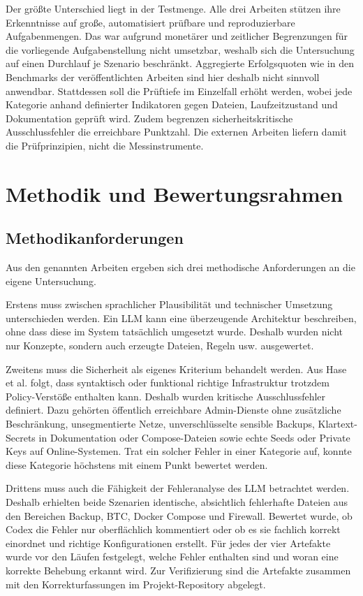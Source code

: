 Der größte Unterschied liegt in der Testmenge. Alle drei Arbeiten stützen ihre Erkenntnisse auf große, automatisiert prüfbare und reproduzierbare Aufgabenmengen. 
Das war aufgrund monetärer und zeitlicher Begrenzungen für die vorliegende Aufgabenstellung nicht umsetzbar, weshalb sich die Untersuchung auf einen Durchlauf je Szenario beschränkt.
Aggregierte Erfolgsquoten wie in den Benchmarks der veröffentlichten Arbeiten sind hier deshalb nicht sinnvoll anwendbar. 
Stattdessen soll die Prüftiefe im Einzelfall erhöht werden, wobei jede Kategorie anhand definierter Indikatoren gegen Dateien, Laufzeitzustand und Dokumentation geprüft wird. Zudem begrenzen sicherheitskritische Ausschlussfehler die erreichbare Punktzahl.
Die externen Arbeiten liefern damit die Prüfprinzipien, nicht die Messinstrumente.


\section{Methodik und Bewertungsrahmen}

\subsection{Methodikanforderungen} \label{subsec:methodikanforderungen}

Aus den genannten Arbeiten ergeben sich drei methodische Anforderungen an die eigene Untersuchung.

Erstens muss zwischen sprachlicher Plausibilität und technischer Umsetzung unterschieden werden. Ein \ac{LLM} kann eine überzeugende Architektur beschreiben, ohne dass diese im System tatsächlich umgesetzt wurde. Deshalb wurden nicht nur Konzepte, sondern auch erzeugte Dateien, Regeln usw. ausgewertet.

Zweitens muss die Sicherheit als eigenes Kriterium behandelt werden. Aus Hase et al. folgt, dass syntaktisch oder funktional richtige Infrastruktur trotzdem Policy-Verstöße enthalten kann.\cite{hase2026securitypolicyiac} Deshalb wurden kritische Ausschlussfehler definiert. Dazu gehörten öffentlich erreichbare Admin-Dienste ohne zusätzliche Beschränkung, unsegmentierte Netze, unverschlüsselte sensible Backups, Klartext-Secrets in Dokumentation oder Compose-Dateien sowie echte Seeds oder Private Keys auf Online-Systemen. Trat ein solcher Fehler in einer Kategorie auf, konnte diese Kategorie höchstens mit einem Punkt bewertet werden.

Drittens muss auch die Fähigkeit der Fehleranalyse des \ac{LLM} betrachtet werden. Deshalb erhielten beide Szenarien identische, absichtlich fehlerhafte Dateien aus den Bereichen Backup, \ac{BTC}, Docker Compose und Firewall. Bewertet wurde, ob Codex die Fehler nur oberflächlich kommentiert oder ob es sie fachlich korrekt einordnet und richtige Konfigurationen erstellt.
Für jedes der vier Artefakte wurde vor den Läufen festgelegt, welche Fehler enthalten sind und woran eine korrekte Behebung erkannt wird. Zur Verifizierung sind die Artefakte zusammen mit den Korrekturfassungen im Projekt-Repository abgelegt.\cite{ki_eval_github}


